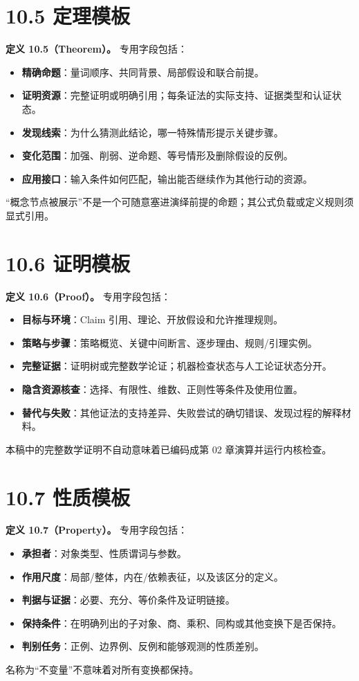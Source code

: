 \documentclass[UTF8,a4paper,zihao=-4,fontset=windows,openany]{ctexbook}
\begin{document}
\section{10.5 定理模板}
\textbf{定义 10.5（Theorem）。} 专用字段包括：

\begin{itemize}
\item \textbf{精确命题}：量词顺序、共同背景、局部假设和联合前提。
\item \textbf{证明资源}：完整证明或明确引用；每条证法的实际支持、证据类型和认证状态。
\item \textbf{发现线索}：为什么猜测此结论，哪一特殊情形提示关键步骤。
\item \textbf{变化范围}：加强、削弱、逆命题、等号情形及删除假设的反例。
\item \textbf{应用接口}：输入条件如何匹配，输出能否继续作为其他行动的资源。
\end{itemize}
“概念节点被展示”不是一个可随意塞进演绎前提的命题；其公式负载或定义规则须显式引用。

\section{10.6 证明模板}
\textbf{定义 10.6（Proof）。} 专用字段包括：

\begin{itemize}
\item \textbf{目标与环境}：Claim 引用、理论、开放假设和允许推理规则。
\item \textbf{策略与步骤}：策略概览、关键中间断言、逐步理由、规则/引理实例。
\item \textbf{完整证据}：证明树或完整数学论证；机器检查状态与人工论证状态分开。
\item \textbf{隐含资源核查}：选择、有限性、维数、正则性等条件及使用位置。
\item \textbf{替代与失败}：其他证法的支持差异、失败尝试的确切错误、发现过程的解释材料。
\end{itemize}
本稿中的完整数学证明不自动意味着已编码成第 02 章演算并运行内核检查。

\section{10.7 性质模板}
\textbf{定义 10.7（Property）。} 专用字段包括：

\begin{itemize}
\item \textbf{承担者}：对象类型、性质谓词与参数。
\item \textbf{作用尺度}：局部/整体，内在/依赖表征，以及该区分的定义。
\item \textbf{判据与证据}：必要、充分、等价条件及证明链接。
\item \textbf{保持条件}：在明确列出的子对象、商、乘积、同构或其他变换下是否保持。
\item \textbf{判别任务}：正例、边界例、反例和能够观测的性质差别。
\end{itemize}
名称为“不变量”不意味着对所有变换都保持。
\end{document}

